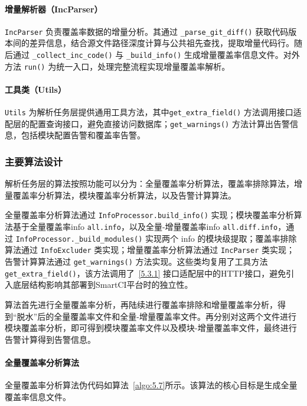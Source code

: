\paragraph{增量解析器（IncParser）}
\verb|IncParser| 负责覆盖率数据的增量分析。其通过 \verb|_parse_git_diff()| 获取代码版本间的差异信息，结合源文件路径深度计算与公共祖先查找，提取增量代码行。随后通过 \verb|_collect_inc_code()| 与 \verb|_build_info()| 生成增量覆盖率信息文件。对外方法 \verb|run()| 为统一入口，处理完整流程实现增量覆盖率解析。

\paragraph{工具类（Utils）}
\verb|Utils| 为解析任务层提供通用工具方法，其中\verb|get_extra_field()| 方法调用接口适配层的配置查询接口，避免直接访问数据库；\verb|get_warnings()| 方法计算出告警信息，包括模块配置告警和覆盖率告警。

\subsubsection{主要算法设计}
解析任务层的算法按照功能可以分为：全量覆盖率分析算法，覆盖率排除算法，增量覆盖率分析算法，模块覆盖率分析算法，以及告警计算算法。

全量覆盖率分析算法通过 \verb|InfoProcessor.build_info()| 实现；模块覆盖率分析算法基于全量覆盖率info \verb|all.info|，以及全量-增量覆盖率info \verb|all.diff.info|，通过 \verb|InfoProcessor._build_modules()| 实现两个 info 的模块级提取；覆盖率排除算法通过 \verb|InfoExcluder| 类实现；增量覆盖率分析算法通过 \verb|IncParser| 类实现；告警计算算法通过 \verb|get_warnings()| 方法实现。这些类均复用了工具方法 \verb|get_extra_field()|，该方法调用了~\ref{5.3.1} 接口适配层中的HTTP接口，避免引入底层结构影响其部署到SmartCI平台时的独立性。

算法首先进行全量覆盖率分析，再陆续进行覆盖率排除和增量覆盖率分析，得到“脱水”后的全量覆盖率文件和全量-增量覆盖率文件。再分别对这两个文件进行模块覆盖率分析，即可得到模块覆盖率文件以及模块-增量覆盖率文件，最终进行告警计算得到告警信息。

\paragraph{\textbf{全量覆盖率分析算法}}
全量覆盖率分析算法伪代码如算法~\ref{algo:5.7}所示。该算法的核心目标是生成全量覆盖率信息文件。

